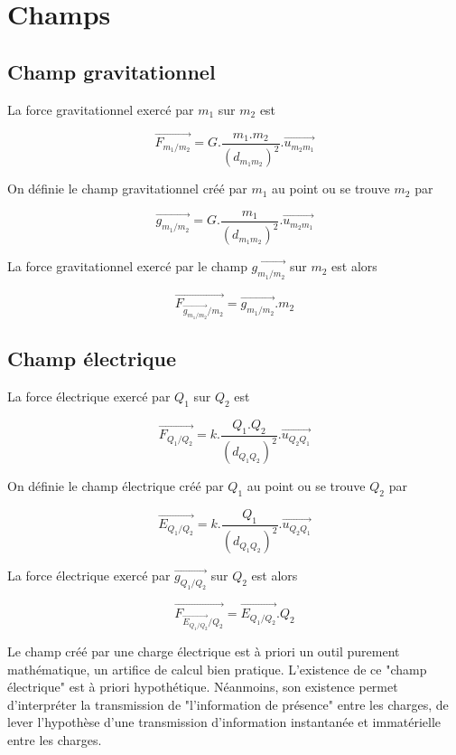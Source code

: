 \chapter{Champs}


\section{Champ gravitationnel}
La force gravitationnel exercé par $m_1$ sur $m_2$ est

\[
\overrightarrow{F_{m_1/m_2}} = G . \frac{m_1.m_2}{(d_{m_1m_2})^2} . \overrightarrow{u_{m_2m_1}}
\]

On définie le champ gravitationnel créé par $m_1$ au point ou se trouve $m_2$ par

\[
\overrightarrow{g_{m_1/m_2}} = G . \frac{m_1}{(d_{m_1m_2})^2} . \overrightarrow{u_{m_2m_1}}
\]

La force gravitationnel exercé par le champ $\overrightarrow{g_{m_1/m_2}}$ sur $m_2$ est alors

\[
\overrightarrow{F_{\overrightarrow{g_{m_1/m_2}}/m_2}} = \overrightarrow{g_{m_1/m_2}} . m_2
\]




\section{Champ électrique}

La force électrique exercé par $Q_1$ sur $Q_2$ est

\[
\overrightarrow{F_{Q_1/Q_2}} = k . \frac{Q_1.Q_2}{(d_{Q_1Q_2})^2} . \overrightarrow{u_{Q_2Q_1}}
\]

On définie le champ électrique créé par $Q_1$ au point ou se trouve $Q_2$ par

\[
\overrightarrow{E_{Q_1/Q_2}} = k . \frac{Q_1}{(d_{Q_1Q_2})^2} . \overrightarrow{u_{Q_2Q_1}}
\]

La force électrique exercé par $\overrightarrow{g_{Q_1/Q_2}}$ sur $Q_2$ est alors

\[
\overrightarrow{F_{\overrightarrow{E_{Q_1/Q_2}}/Q_2}} = \overrightarrow{E_{Q_1/Q_2}} . Q_2
\]

Le champ créé par une charge électrique est à priori un outil purement mathématique, un artifice de calcul bien pratique. L'existence de ce "champ électrique" est à priori hypothétique. Néanmoins, son existence permet d'interpréter la transmission de "l'information de présence" entre les charges, de lever l'hypothèse d'une transmission d'information instantanée et immatérielle entre les charges.

